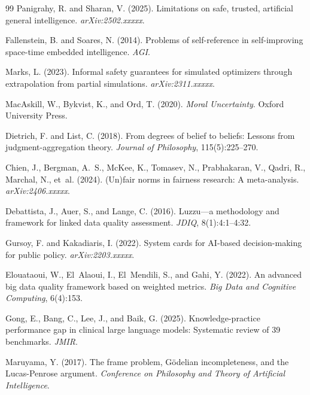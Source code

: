 \documentclass[11pt]{article}
\begin{document}
\begin{thebibliography}{99}
Panigrahy, R. and Sharan, V. (2025). Limitations on safe, trusted, artificial general intelligence. \textit{arXiv:2502.xxxxx}.

Fallenstein, B. and Soares, N. (2014). Problems of self-reference in self-improving space-time embedded intelligence. \textit{AGI}.

Marks, L. (2023). Informal safety guarantees for simulated optimizers through extrapolation from partial simulations. \textit{arXiv:2311.xxxxx}.

MacAskill, W., Bykvist, K., and Ord, T. (2020). \textit{Moral Uncertainty}. Oxford University Press.

Dietrich, F. and List, C. (2018). From degrees of belief to beliefs: Lessons from judgment-aggregation theory. \textit{Journal of Philosophy}, 115(5):225--270.

Chien, J., Bergman, A.~S., McKee, K., Tomasev, N., Prabhakaran, V., Qadri, R., Marchal, N., et~al. (2024). (Un)fair norms in fairness research: A meta-analysis. \textit{arXiv:2406.xxxxx}.

Debattista, J., Auer, S., and Lange, C. (2016). Luzzu---a methodology and framework for linked data quality assessment. \textit{JDIQ}, 8(1):4:1--4:32.

Gursoy, F. and Kakadiaris, I. (2022). System cards for AI-based decision-making for public policy. \textit{arXiv:2203.xxxxx}.

Elouataoui, W., El~Alaoui, I., El~Mendili, S., and Gahi, Y. (2022). An advanced big data quality framework based on weighted metrics. \textit{Big Data and Cognitive Computing}, 6(4):153.

Gong, E., Bang, C., Lee, J., and Baik, G. (2025). Knowledge-practice performance gap in clinical large language models: Systematic review of 39 benchmarks. \textit{JMIR}.

Maruyama, Y. (2017). The frame problem, G\"{o}delian incompleteness, and the Lucas-Penrose argument. \textit{Conference on Philosophy and Theory of Artificial Intelligence}.


\end{thebibliography}
\end{document}
